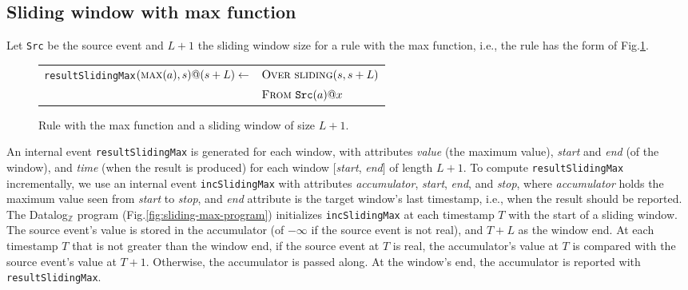 \subsection{Sliding window with {\sc max} function}
\label{sec:sliding-max-datalog-program}

Let \texttt{Src} be the source event and $L+1$
the sliding window size for a rule
with the {\sc max} function,
i.e., the rule has the form of Fig.\:\ref{fig:sliding-max-rule}.

\begin{figure}[h!]
\begin{tabular}{ll}
\texttt{resultSlidingMax}$(\mbox{\sc max}(a),s)@(s+L) \leftarrow$   & $\textsc{Over}\ \mbox{\sc sliding}(s,s+L)$\\
                                                                    & $\textsc{From}\ \mbox{\tt Src}(a)@x$
\end{tabular}
\caption{Rule with the {\sc max} function and a sliding window of size $L+1$.}
\label{fig:sliding-max-rule}
\end{figure}

An internal event \texttt{resultSlidingMax}
is generated for each window,
with attributes {\em value} (the maximum value),
{\em start} and {\em end} (of the window), and {\em time}
(when the result is produced)
for each window $[$\mbox{\em start},
\mbox{\em end}$]$ of length $L+1$.
To compute \texttt{resultSlidingMax} incrementally,
we use an internal event \texttt{incSlidingMax} with attributes
{\em accumulator}, {\em start}, {\em end}, and {\em stop},
where {\em accumulator}
holds the maximum value seen from {\em start} to {\em stop},
and {\em end} attribute is the target window's last timestamp,
i.e., when the result should be reported.
The Datalog$_{\mathbb{Z}}$ program (Fig.\:\ref{fig:sliding-max-program})
initializes \texttt{incSlidingMax} at each timestamp $T$
with the start of a sliding window.
The source event's value is stored in the accumulator
(of $-\infty$ if the source event is not real),
and $T{+}L$ as the window end.
At each timestamp $T$ that is not greater than the window end,
if the source event at $T$ is real,
the accumulator's value at $T$
is compared with the source event's value at $T{+}1$.
Otherwise, the accumulator is passed along.
At the window's end,
the accumulator is reported with \texttt{resultSlidingMax}.

